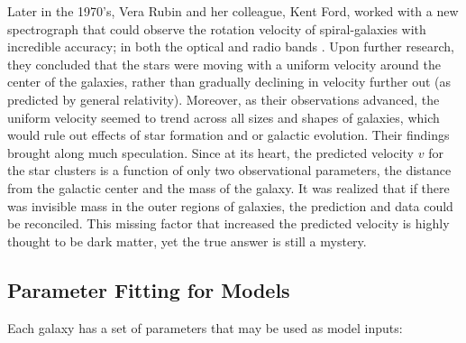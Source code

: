 \documentclass[conference]{IEEEtran}
\begin{document}
Later in the 1970's, Vera Rubin and her colleague, Kent Ford, worked with a new spectrograph that could observe the rotation velocity of spiral-galaxies with incredible accuracy; in both the optical and radio bands \cite{rubin1980}. Upon further research, they concluded that the stars were moving with a uniform velocity around the center of the galaxies, rather than gradually declining in velocity further out (as predicted by general relativity).  Moreover, as their observations advanced, the uniform velocity seemed to trend across all sizes and shapes of galaxies, which would rule out effects of star formation and or galactic evolution. Their findings brought along much speculation.  Since at its heart, the predicted velocity $v$ for the star clusters is a function of only two observational parameters, the distance from the galactic center and the mass of the galaxy. It was realized that if there was invisible mass in the outer regions of galaxies, the prediction and data could be reconciled. This missing factor that increased the predicted velocity is highly thought to be dark matter, yet the true answer is still a mystery. 


\subsection{Parameter Fitting for Models}
Each galaxy has a set of parameters that may be used as model inputs: 
\begin{table}[h]
	\centering
	\normalsize
\end{table}
\end{document}
